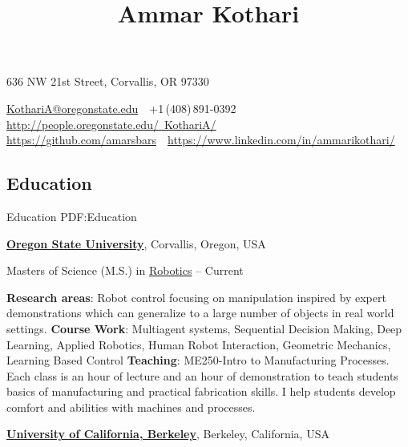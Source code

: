 \documentclass[letterpaper,10pt,oneside]{article}
\newcommand{\CVAuthor}{Ammar Kothari}
\newcommand{\CVWebpage}{http://people.oregonstate.edu/~KothariA/}
\newcommand{\CVGitHub}{https://github.com/amarsbars}
\newcommand{\CVLinkedIn}{https://www.linkedin.com/in/ammarikothari/}
\begin{document}

\title{\CVAuthor}

\begin{subtitle}
{636 NW 21st Street, Corvallis, OR 97330}
\par
\href{mailto:KothariA@oregonstate.edu}
{KothariA@oregonstate.edu}
\,\SubBulletSymbol\,
+1\,(408)\,891-0392
\,\SubBulletSymbol\,
\href{\CVWebpage}
{\CVWebpage}\\
\href{\CVGitHub}
{\CVGitHub}
\,\SubBulletSymbol\,
\href{\CVLinkedIn}
{\CVLinkedIn}
\end{subtitle}

\begin{body}


\section{Education}{Education}
{PDF:Education}

\href{http://oregonstate.edu/}
{\textbf{Oregon State University}},
Corvallis, Oregon, USA

\GapNoBreak
\BulletItem
Masters of Science (M.S.) in
\href{http://robotics.oregonstate.edu/}
{Robotics}
\hfill
{} --
Current
\begin{detail}
\SubBulletItem
\textbf{Research areas}:
Robot control focusing on manipulation inspired by expert demonstrations which can generalize to a large number of objects in real world settings.
\SubBulletItem
\textbf{Course Work}: Multiagent systems, Sequential Decision Making, Deep Learning, Applied Robotics, Human Robot Interaction, Geometric Mechanics, Learning Based Control
\SubBulletItem
\textbf{Teaching}: ME250-Intro to Manufacturing Processes.  Each class is an hour of lecture and an hour of demonstration to teach students basics of manufacturing and practical fabrication skills. I help students develop comfort and abilities with machines and processes.
\end{detail}

\BigGap
\href{http://www.berkeley.edu/}
{\textbf{University of California, Berkeley}},
Berkeley, California, USA


\end{body}
\end{document}
